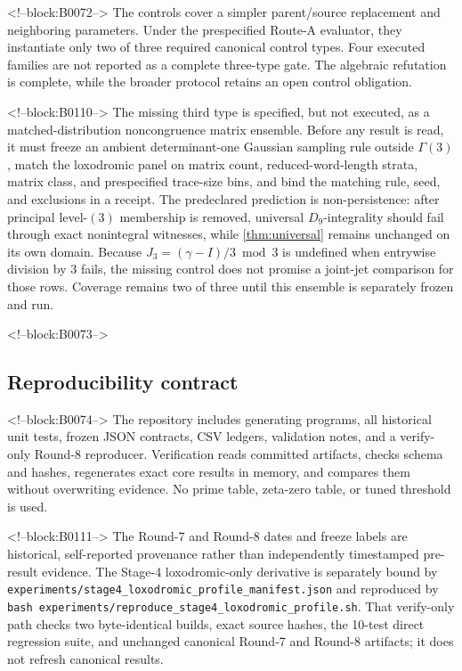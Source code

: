 \documentclass[11pt,a4paper]{article}
\theoremstyle{definition}
\theoremstyle{remark}
\begin{document}
<!--block:B0072-->
The controls cover a simpler parent/source replacement and neighboring parameters. Under the prespecified Route-A evaluator, they instantiate only two of three required canonical control types. Four executed families are not reported as a complete three-type gate. The algebraic refutation is complete, while the broader protocol retains an open control obligation.

<!--block:B0110-->
The missing third type is specified, but not executed, as a matched-distribution noncongruence matrix ensemble. Before any result is read, it must freeze an ambient determinant-one Gaussian sampling rule outside \(\Gamma(3)\), match the loxodromic panel on matrix count, reduced-word-length strata, matrix class, and prespecified trace-size bins, and bind the matching rule, seed, and exclusions in a receipt. The predeclared prediction is non-persistence: after principal level-\((3)\) membership is removed, universal \(D_9\)-integrality should fail through exact nonintegral witnesses, while \cref{thm:universal} remains unchanged on its own domain. Because \(J_3=(\gamma-I)/3\bmod3\) is undefined when entrywise division by \(3\) fails, the missing control does not promise a joint-jet comparison for those rows. Coverage remains two of three until this ensemble is separately frozen and run.

<!--block:B0073-->
\subsection{Reproducibility contract}

<!--block:B0074-->
The repository includes generating programs, all historical unit tests, frozen JSON contracts, CSV ledgers, validation notes, and a verify-only Round-8 reproducer. Verification reads committed artifacts, checks schema and hashes, regenerates exact core results in memory, and compares them without overwriting evidence. No prime table, zeta-zero table, or tuned threshold is used.

<!--block:B0111-->
The Round-7 and Round-8 dates and freeze labels are historical, self-reported provenance rather than independently timestamped pre-result evidence. The Stage-4 loxodromic-only derivative is separately bound by \texttt{experiments/stage4\_loxodromic\_profile\_manifest.json} and reproduced by \texttt{bash experiments/reproduce\_stage4\_loxodromic\_profile.sh}. That verify-only path checks two byte-identical builds, exact source hashes, the 10-test direct regression suite, and unchanged canonical Round-7 and Round-8 artifacts; it does not refresh canonical results.
\end{document}
